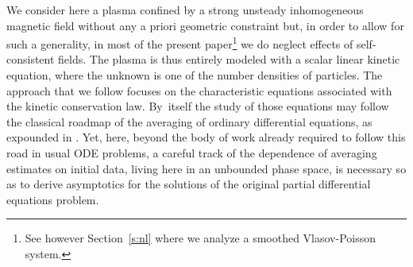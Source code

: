 \documentclass[10pt]{amsart}
\theoremstyle{plain}
\theoremstyle{definition}
\begin{document}
We consider here a plasma confined by a strong unsteady inhomogeneous magnetic field without any a priori geometric constraint but, in order to allow for such a generality, in most of the present paper\footnote{See however Section~\ref{s:nl} where we analyze a smoothed Vlasov-Poisson system.} we do neglect effects of self-consistent fields. The plasma is thus entirely modeled with a scalar linear kinetic equation, where the unknown is one of the number densities of particles. The approach that we follow focuses on the characteristic equations associated with the kinetic conservation law. By~itself the study of those equations may follow the classical roadmap of the averaging of ordinary differential equations, as expounded in \cite{Bogoliubov-Mitropolsky_oscillations,Sanders-Verhulst-Murdock_averaging}. Yet, here, beyond the body of work already required to follow this road in usual ODE problems, a careful track of the dependence of averaging estimates on initial data, living here in an unbounded phase space, is necessary so as to derive asymptotics for the solutions of the original partial differential equations problem.
\end{document}
